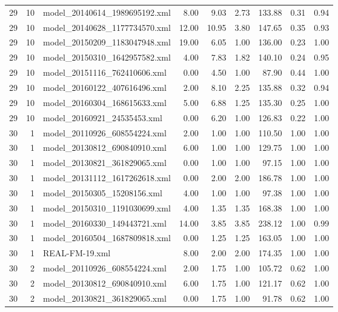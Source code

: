 \begin{table}[ht]
\begin{tabular}{rrlrrrrrr}
   29 &  10 & model\_20140614\_1989695192.xml & 8.00 & 9.03 & 2.73 & 133.88 & 0.31 & 0.94 \\ 
   29 &  10 & model\_20140628\_1177734570.xml & 12.00 & 10.95 & 3.80 & 147.65 & 0.35 & 0.93 \\ 
   29 &  10 & model\_20150209\_1183047948.xml & 19.00 & 6.05 & 1.00 & 136.00 & 0.23 & 1.00 \\ 
   29 &  10 & model\_20150310\_1642957582.xml & 4.00 & 7.83 & 1.82 & 140.10 & 0.24 & 0.95 \\ 
   29 &  10 & model\_20151116\_762410606.xml & 0.00 & 4.50 & 1.00 & 87.90 & 0.44 & 1.00 \\ 
   29 &  10 & model\_20160122\_407616496.xml & 2.00 & 8.10 & 2.25 & 135.88 & 0.32 & 0.94 \\ 
   29 &  10 & model\_20160304\_168615633.xml & 5.00 & 6.88 & 1.25 & 135.30 & 0.25 & 1.00 \\ 
   29 &  10 & model\_20160921\_24535453.xml & 0.00 & 6.20 & 1.00 & 126.83 & 0.22 & 1.00 \\ 
   30 &   1 & model\_20110926\_608554224.xml & 2.00 & 1.00 & 1.00 & 110.50 & 1.00 & 1.00 \\ 
   30 &   1 & model\_20130812\_690840910.xml & 6.00 & 1.00 & 1.00 & 129.75 & 1.00 & 1.00 \\ 
   30 &   1 & model\_20130821\_361829065.xml & 0.00 & 1.00 & 1.00 & 97.15 & 1.00 & 1.00 \\ 
   30 &   1 & model\_20131112\_1617262618.xml & 0.00 & 2.00 & 2.00 & 186.78 & 1.00 & 1.00 \\ 
   30 &   1 & model\_20150305\_15208156.xml & 4.00 & 1.00 & 1.00 & 97.38 & 1.00 & 1.00 \\ 
   30 &   1 & model\_20150310\_1191030699.xml & 4.00 & 1.35 & 1.35 & 168.38 & 1.00 & 1.00 \\ 
   30 &   1 & model\_20160330\_149443721.xml & 14.00 & 3.85 & 3.85 & 238.12 & 1.00 & 0.99 \\ 
   30 &   1 & model\_20160504\_1687809818.xml & 0.00 & 1.25 & 1.25 & 163.05 & 1.00 & 1.00 \\ 
   30 &   1 & REAL-FM-19.xml & 8.00 & 2.00 & 2.00 & 174.35 & 1.00 & 1.00 \\ 
   30 &   2 & model\_20110926\_608554224.xml & 2.00 & 1.75 & 1.00 & 105.72 & 0.62 & 1.00 \\ 
   30 &   2 & model\_20130812\_690840910.xml & 6.00 & 1.75 & 1.00 & 121.17 & 0.62 & 1.00 \\ 
   30 &   2 & model\_20130821\_361829065.xml & 0.00 & 1.75 & 1.00 & 91.78 & 0.62 & 1.00 \\ 

\end{tabular}
\end{table}

